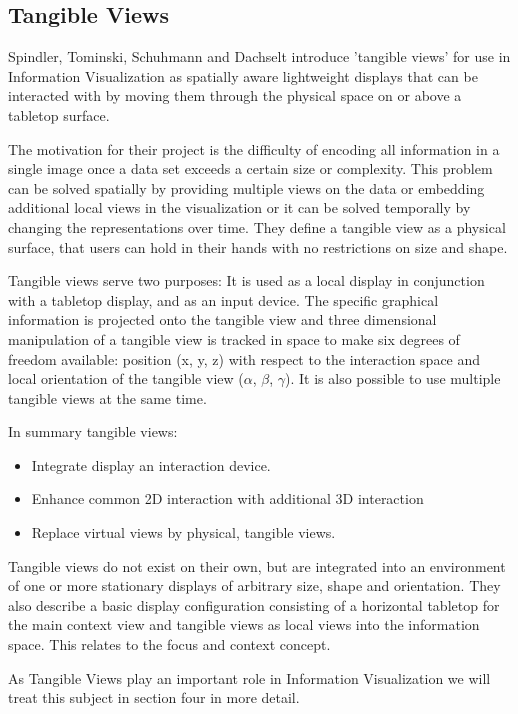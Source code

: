 \subsection{Tangible Views}
Spindler, Tominski, Schuhmann and Dachselt \cite{spindler10} introduce 'tangible views' for use in Information Visualization as spatially aware lightweight displays that can be interacted with by moving them through the physical space on or above a tabletop surface. 

The motivation for their project is the difficulty of encoding all information in a single image once a data set exceeds a certain size or complexity. This problem can be solved spatially by providing multiple views on the data or embedding additional local views in the visualization or it can be solved temporally by changing the representations over time. They define a tangible view as a physical surface, that users can hold in their hands with no restrictions on size and shape.
 
Tangible views serve two purposes: It is used as a local display in conjunction with a tabletop display, and as an input device. The specific graphical information is projected onto the tangible view and three dimensional manipulation of a tangible view is tracked in space to make six degrees of freedom available: position (x, y, z) with respect to the interaction space and local orientation of the tangible view ($\alpha$, $\beta$, $\gamma$). It is also possible to use multiple tangible views at the same time. 

In summary tangible views:
\begin{itemize}
\item Integrate display an interaction device.
\item Enhance common 2D interaction with additional 3D interaction
\item Replace virtual views by physical, tangible views.
\end{itemize}

Tangible views do not exist on their own, but are integrated into an environment of one or more stationary displays of arbitrary size, shape and orientation. 
They also describe a basic display configuration consisting of a horizontal tabletop for the main context view and tangible views as local views into the information space. This relates to the focus and context concept.

As Tangible Views play an important role in Information Visualization we will treat this subject in section four in more detail.


